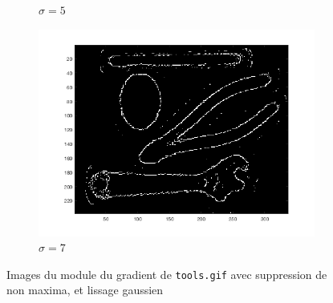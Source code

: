\documentclass[a4paper]{article}
\begin{document}
\begin{figure}[H]
\begin{subfigure}[c]{0.3\textwidth}
        \caption{$\sigma=5$}
    \end{subfigure}
    \begin{subfigure}[c]{0.3\textwidth}
        \centering
        \includegraphics[width=\textwidth]{images/tools_nms_gauss7.png}
        \caption{$\sigma=7$}
    \end{subfigure}

    \caption{Images du module du gradient de \texttt{tools.gif} avec
    suppression de non maxima, et lissage gaussien}
    \label{fig:tools-nms-gauss-var}
\end{figure}
\end{document}
